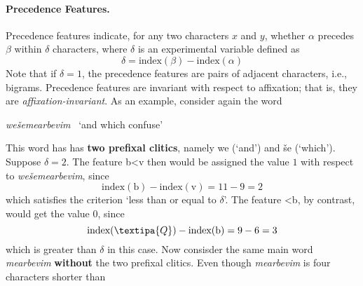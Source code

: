 \paragraph{Precedence Features.}
Precedence features indicate, for any two characters $x$ and $y$,
whether $\alpha$ precedes $\beta$ within $\delta$ characters,
where $\delta$ is an experimental variable defined as
	\begin{equation}\label{eq:indexdif}
	\delta = \text{index}(\beta) - \text{index}(\alpha)
	\end{equation}
Note that if $\delta = 1$, the precedence features are 
pairs of adjacent characters, i.e., bigrams.
Precedence features are invariant with respect to affixation; that is, 
they are \emph{affixation-invariant}.
As an example, consider again the word
\begin{center}
\textit{we\v{s}emearbevim} \, `and which confuse'
\end{center} 
This word has has \textbf{two prefixal clitics}, namely \textsf{we} 
(`and') and \textsf{\v{s}e} (`which').
Suppose $\delta=2$. The feature \textsf{b<v} then would be assigned the value $1$ with respect to
\textit{we\v{s}emearbevim}, since
\begin{equation*}
\text{index}(\text{b}) - \text{index}(\text{v}) = 11 - 9 = 2
\end{equation*}
which satisfies the criterion `less than or equal to $\delta$'. 
The feature \textsf{<b}, by contrast, would get the value $0$, since 
\begin{equation*}
\text{index}(\textipa{Q}) - \text{index}(\text{b}) = 9 - 6 = 3
\end{equation*}
which is greater than $\delta$ in this case.
Now consisder the same main word \textit{mearbevim} \textbf{without}
the two prefixal clitics. Even though \textit{mearbevim} is four characters shorter than
